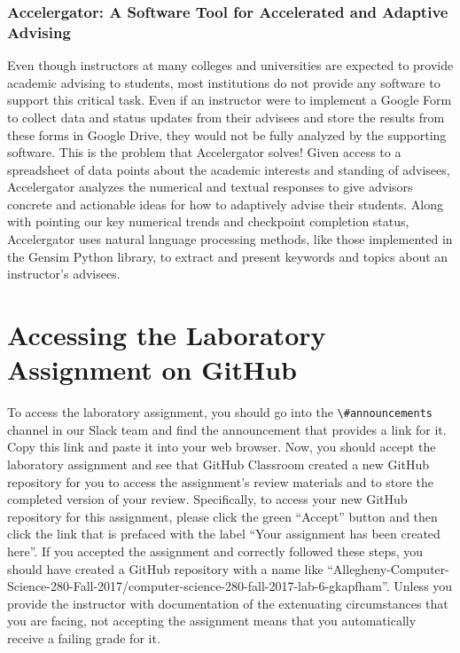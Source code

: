 \documentclass[11pt]{article}
\newcommand{\channel}[1]{\lstinline{#1}}
\begin{document}
\vspace*{-.5em}

\subsubsection*{Accelergator: A Software Tool for Accelerated and Adaptive Advising}

Even though instructors at many colleges and universities are expected to provide academic advising to students, most
institutions do not provide any software to support this critical task. Even if an instructor were to implement a Google
Form to collect data and status updates from their advisees and store the results from these forms in Google Drive, they
would not be fully analyzed by the supporting software. This is the problem that Accelergator solves! Given access to a
spreadsheet of data points about the academic interests and standing of advisees, Accelergator analyzes the numerical
and textual responses to give advisors concrete and actionable ideas for how to adaptively advise their students. Along
with pointing our key numerical trends and checkpoint completion status, Accelergator uses natural language
processing methods, like those implemented in the Gensim Python library, to extract and present keywords and topics
about an instructor's advisees.

\section*{Accessing the Laboratory Assignment on GitHub}

To access the laboratory assignment, you should go into the \channel{\#announcements} channel in our Slack team and find
the announcement that provides a link for it. Copy this link and paste it into your web browser. Now, you should accept
the laboratory assignment and see that GitHub Classroom created a new GitHub repository for you to access the
assignment's review materials and to store the completed version of your review. Specifically, to access your new
GitHub repository for this assignment, please click the green ``Accept'' button and then click the link that is prefaced
with the label ``Your assignment has been created here''. If you accepted the assignment and correctly followed these
steps, you should have created a GitHub repository with a name like
``Allegheny-Computer-Science-280-Fall-2017/computer-science-280-fall-2017-lab-6-gkapfham''. Unless you provide the
instructor with documentation of the extenuating circumstances that you are facing, not accepting the assignment means
that you automatically receive a failing grade for it.
\end{document}
